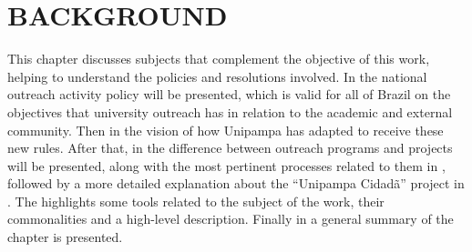 
\chapter{BACKGROUND}\label{background}


This chapter discusses subjects that complement the objective of this work, helping to understand the policies and resolutions involved.
In  the national outreach activity policy will be presented, which is valid for all of Brazil on the objectives that university outreach has in relation to the academic and external community.
Then in  the vision of how Unipampa has adapted to receive these new rules.
After that, in  the difference between outreach programs and projects will be presented, along with the most pertinent processes related to them in , followed by a more detailed explanation about the ``Unipampa Cidadã'' project in .
The  highlights some tools related to the subject of the work, their commonalities and a high-level description.
Finally in  a general summary of the chapter is presented.

